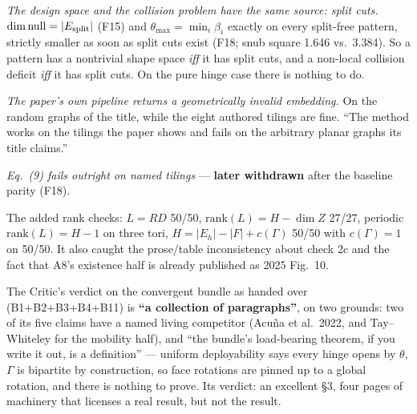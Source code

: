 \documentclass[10pt,a4paper]{article}
\begin{document}
\begin{description}[leftmargin=8mm,style=nextline,nosep]
\item[P1.] \emph{The design space and the collision problem have the same source: split cuts.}
$\dim\mathrm{null} = |E_{\rm split}|$ (F15) and $\theta_{\max} = \min_i\beta_i$ exactly on every
split-free pattern, strictly smaller as soon as split cuts exist (F18; snub square 1.646 vs.\
3.384). So a pattern has a nontrivial shape space \emph{iff} it has split cuts, and a non-local
collision deficit \emph{iff} it has split cuts. On the pure hinge case there is nothing to do.
\item[P2.] \emph{The paper's own pipeline returns a geometrically invalid embedding.} On the
random graphs of the title, while the eight authored tilings are fine. ``The method works on
the tilings the paper shows and fails on the arbitrary planar graphs its title claims.''
\item[P3.] \emph{Eq.~(9) fails outright on named tilings} --- \textbf{later withdrawn} after the
baseline parity (F18).
\item[P4.] The added rank checks: $L = RD$ 50/50, $\mathrm{rank}(L) = H - \dim Z$ 27/27,
periodic $\mathrm{rank}(L) = H-1$ on three tori, $H = |E_h|-|F|+c(\Gamma)$ 50/50 with
$c(\Gamma)=1$ on 50/50. It also caught the prose/table inconsistency about check 2c and the fact
that A8's existence half is already published as 2025 Fig.~10.
\end{description}

The Critic's verdict on the convergent bundle as handed over (B1+B2+B3+B4+B11) is
\textbf{``a collection of paragraphs''}, on two grounds: two of its five claims have a named
living competitor (Acu\~na et al.\ 2022, and Tay--Whiteley for the mobility half), and
``the bundle's load-bearing theorem, if you write it out, is a definition'' --- uniform
deployability says every hinge opens by $\theta$, $\Gamma$ is bipartite by construction, so
face rotations are pinned up to a global rotation, and there is nothing to prove. Its verdict:
an excellent \S3, four pages of machinery that licenses a real result, but not the result.
\end{document}
